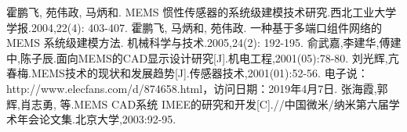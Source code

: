 \documentclass[no-math]{YangThesis}
\begin{document}
\begin{thebibliography}{9}
  霍鹏飞, 苑伟政, 马炳和. MEMS 惯性传感器的系统级建模技术研究.西北工业大学学报.2004,22(4): 403-407.
  霍鹏飞, 马炳和, 苑伟政. 一种基于多端口组件网络的 MEMS 系统级建模方法. 机械科学与技术.2005,24(2): 192-195.
  俞武嘉,李建华,傅建中,陈子辰.面向MEMS的CAD显示设计研究[J].机电工程,2001(05):78-80.
  刘光辉,亢春梅.MEMS技术的现状和发展趋势[J].传感器技术,2001(01):52-56.
  电子说：http://www.elecfans.com/d/874658.html，访问日期：2019年4月7日.
  张海霞,郭辉,肖志勇, 等.MEMS CAD系统 IMEE的研究和开发[C].//中国微米/纳米第六届学术年会论文集.北京大学,2003:92-95.

\end{thebibliography}
\end{document}
